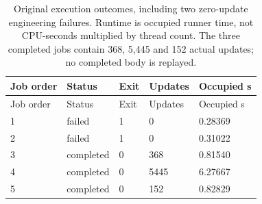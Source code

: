 \begin{longtable}{lllll}
\caption{Original execution outcomes, including two zero-update engineering failures. Runtime is occupied runner time, not CPU-seconds multiplied by thread count. The three completed jobs contain 368, 5,445 and 152 actual updates; no completed body is replayed.}\label{tab:physical-state-jobs}\\
\toprule
Job order & Status & Exit & Updates & Occupied s \\
\midrule
\endfirsthead
\toprule
Job order & Status & Exit & Updates & Occupied s \\
\midrule
\endhead
1 & failed & 1 & 0 & 0.28369 \\
2 & failed & 1 & 0 & 0.31022 \\
3 & completed & 0 & 368 & 0.81540 \\
4 & completed & 0 & 5445 & 6.27667 \\
5 & completed & 0 & 152 & 0.82829 \\
\bottomrule
\end{longtable}
\endgroup
